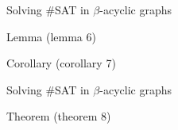 \begin{frame}[t]{Solving \#SAT in $\beta$-acyclic graphs}
	\begin{block}{Lemma (lemma 6)}
	\end{block}
	\begin{block}{Corollary (corollary 7)}
	\end{block}
\end{frame}

\begin{frame}[t]{Solving \#SAT in $\beta$-acyclic graphs}
	\begin{block}{Theorem (theorem 8)}
	\end{block}
\end{frame}
